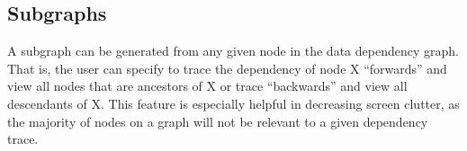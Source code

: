 \subsection{Subgraphs}
 A subgraph can be generated from any given node in the data dependency graph. That is, the user can specify to trace the dependency of node X “forwards” and view all nodes that are ancestors of X or trace “backwards” and view all descendants of X. This feature is especially helpful in decreasing screen clutter, as the majority of nodes on a graph will not be relevant to a given dependency trace. 